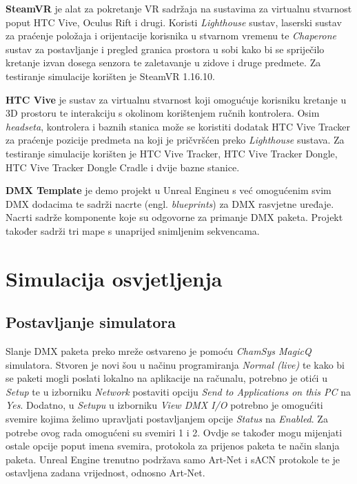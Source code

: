 \documentclass[times, utf8, zavrsni, numeric]{fer}
\begin{document}
\textbf{SteamVR} \cite{SteamVR} je alat za pokretanje VR sadržaja na sustavima za virtualnu stvarnost poput HTC Vive, Oculus Rift i drugi. Koristi \emph{Lighthouse} sustav, laserski sustav za praćenje položaja i orijentacije korisnika u stvarnom vremenu te \emph{Chaperone} sustav za postavljanje i pregled granica prostora u sobi kako bi se spriječilo kretanje izvan dosega senzora te zaletavanje u zidove i druge predmete.
Za testiranje simulacije korišten je SteamVR 1.16.10. \newline

\textbf{HTC Vive} \cite{HTC_Vive} je sustav za virtualnu stvarnost koji omogućuje korisniku kretanje u 3D prostoru te interakciju s okolinom korištenjem ručnih kontrolera. Osim \emph{headseta}, kontrolera i baznih stanica može se koristiti dodatak HTC Vive Tracker za praćenje pozicije predmeta na koji je pričvršćen preko \emph{Lighthouse} sustava.
Za testiranje simulacije korišten je HTC Vive Tracker, HTC Vive Tracker Dongle, HTC Vive Tracker Dongle Cradle i dvije bazne stanice. \newline

\textbf{DMX Template} \cite{dmx_template} je demo projekt u Unreal Engineu s već omogućenim svim DMX dodacima te sadrži nacrte (engl. \emph{blueprints}) za DMX rasvjetne uređaje. Nacrti sadrže komponente koje su odgovorne za primanje DMX paketa. Projekt također sadrži tri mape s unaprijed snimljenim sekvencama.

\chapter{Simulacija osvjetljenja}

\section{Postavljanje simulatora}
Slanje DMX paketa preko mreže ostvareno je pomoću \emph{ChamSys MagicQ} simulatora. Stvoren je novi šou u načinu programiranja \emph{Normal (live)} te kako bi se paketi mogli poslati lokalno na aplikacije na računalu, potrebno je otići u \emph{Setup} te u izborniku \emph{Network} postaviti opciju \emph{Send to Applications on this PC} na \emph{Yes}. Dodatno, u \emph{Setupu} u izborniku \emph{View DMX I/O} potrebno je omogućiti svemire kojima želimo upravljati postavljanjem opcije \emph{Status} na \emph{Enabled}. Za potrebe ovog rada omogućeni su svemiri 1 i 2. Ovdje se također mogu mijenjati ostale opcije poput imena svemira, protokola za prijenos paketa te način slanja paketa. Unreal Engine trenutno podržava samo Art-Net i sACN protokole te je ostavljena zadana vrijednost, odnosno Art-Net. \newline
\end{document}
